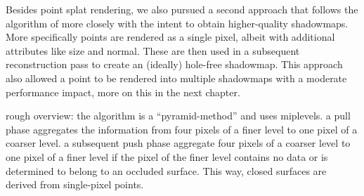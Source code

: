 \begin{outline}
\1 Besides point splat rendering, we also pursued a second approach that follows the algorithm of \citet{Marroquim:2007:reconstruction} more closely with the intent to obtain higher-quality shadowmaps. More specifically points are rendered as a single pixel, albeit with additional attributes like size and normal. These are then used in a subsequent reconstruction pass to create an (ideally) hole-free shadowmap. This approach also allowed a point to be rendered into multiple shadowmaps with a moderate performance impact, more on this in the next chapter.

\1 rough overview: the algorithm is a ``pyramid-method'' and uses miplevels.
\1 a pull phase aggregates the information from four pixels of a finer level to one pixel of a coarser level.
\1 a subsequent push phase aggregate four pixels of a coarser level to one pixel of a finer level if the pixel of the finer level contains no data or is determined to belong to an occluded surface. This way, closed surfaces are derived from single-pixel points.


\end{outline}
